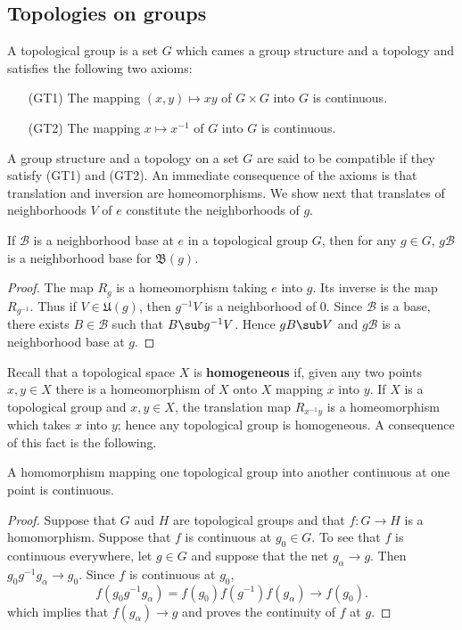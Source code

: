 \subsection{Topologies on groups}
\begin{definition}
A topological group is a set $G$ which cames a group structure and a topology and satisfies the following two axioms:
\begin{enumerate}[leftmargin=40pt]
\item[(GT1)] The mapping $(x,y)\mapsto xy$ of $G\times G$ into $G$ is continuous.
\item[(GT2)] The mapping $x\mapsto x^{-1}$ of $G$ into $G$ is continuous.
\end{enumerate}
\end{definition}
A group structure and a topology on a set $G$ are said to be compatible
if they satisfy (GT1) and (GT2). An immediate consequence of the axioms is that translation and inversion are homeomorphisms. We show next that translates of neighborhoods $V$ of $e$ constitute the neighborhoods of $g$.
\begin{proposition}
If $\mathcal{B}$ is a neighborhood base at $e$ in a topological group $G$, then for any $g\in G$, $g\mathcal{B}$ is a neighborhood base for $\mathfrak{B}(g)$.
\end{proposition}
\begin{proof}
The map $R_g$ is a homeomorphism taking $e$ into $g$. Its inverse is the map $R_{g^{-1}}$. Thus if $V\in\mathfrak{U}(g)$, then $g^{-1}V$ is a neighborhood of $0$. Since $\mathcal{B}$ is a base, there exists $B\in\mathcal{B}$ such that $B\sub g^{-1}V$. Hence $gB\sub V$ and $g\mathcal{B}$ is a neighborhood base at $g$.
\end{proof}
Recall that a topological space $X$ is \textbf{homogeneous} if, given any two points $x,y\in X$ there is a homeomorphism of $X$ onto $X$ mapping $x$ into $y$. If $X$ is a topological group and $x,y\in X$, the translation map $R_{x^{-1}y}$ is a homeomorphism which takes $x$ into $y$; hence any topological group is homogeneous. A consequence of this fact is the following.
\begin{proposition}\label{topological group homomorphism continuous iff at one point}
A homomorphism mapping one topological group into another continuous at one point is continuous.
\end{proposition}
\begin{proof}
Suppose that $G$ aud $H$ are topological groups and that $f:G\to H$ is a homomorphism. Suppose that $f$ is continuous at $g_0\in G$. To see that $f$ is continuous everywhere, let $g\in G$ and suppose that the net $g_\alpha\to g$. Then $g_0g^{-1}g_\alpha\to g_0$. Since $f$ is continuous at $g_0$,
\[f(g_0g^{-1}g_\alpha)=f(g_0)f(g^{-1})f(g_\alpha)\to f(g_0).\]
which implies that $f(g_\alpha)\to g$ and proves the continuity of $f$ at $g$.
\end{proof}
